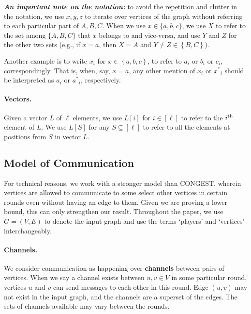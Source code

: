 \documentclass[11pt]{article}
\theoremstyle{definition}
\newcommand{\set}[1]{\ensuremath{\left\{ #1 \right\}}}
\newcommand{\cC}{\ensuremath{\mathcal{C}}}
\newcommand{\xstar}{\ensuremath{x^{*}}}
\newcommand{\astar}{\ensuremath{a^*}}
\begin{document}
\noindent
\emph{\textbf{An important note on the notation:}} to avoid the repetition and clutter in the notation, we use $x, y, z$ to iterate over vertices of the graph without referring to each particular part of $A,B,C$. When we use $x \in \{a, b, c\}$, we use $X$ to refer to the set among $\{A,B,C\}$ that $x$ belongs to and vice-versa, and use $Y$ and $Z$ for the other two sets (e.g., if $x=a$, then $X=A$ and $Y \neq Z \in \set{B,C}$). 

Another example is to write $x_i$ for $x \in \set{a,b,c}$, to refer to $a_i$ or $b_i$ or $c_i$, correspondingly. That is, when, say, $x=a$, any other mention of $x_i$ or $\xstar_i$ should be interpreted as $a_i$ or $\astar_i$, respectively. %

\paragraph{Vectors.}
Given a vector $L$ of $\ell$ elements, we use $L[i]$ for $i \in [\ell]$ to refer to the $i^{\textnormal{th}}$ element of $L$. We use $L[S]$ for any $S \subseteq [\ell]$ to refer to all the elements at positions from $S$ in vector $L$.

\subsection{Model of Communication}\label{subsec:prelim-model}

For technical reasons, we work with a stronger model than CONGEST, wherein vertices are allowed to communicate to some select other vertices in certain rounds even without having an edge to them. Given we are proving a lower bound, 
this can only strengthen our result. 
Throughout the paper, we use $G=(V,E)$ to denote the input graph and use the terms `players' and `vertices' interchangeably. 


\paragraph{Channels.} We consider communication as happening over \textbf{channels} between pairs of vertices. When we say a channel exists between $u, v \in V$ in some particular round, vertices $u$ and $v$ can send messages to each other in this round. 
Edge $(u,v)$ may not exist in the input graph, and the channels are a superset of the edges. The sets of channels available may vary between the rounds. 
\end{document}
